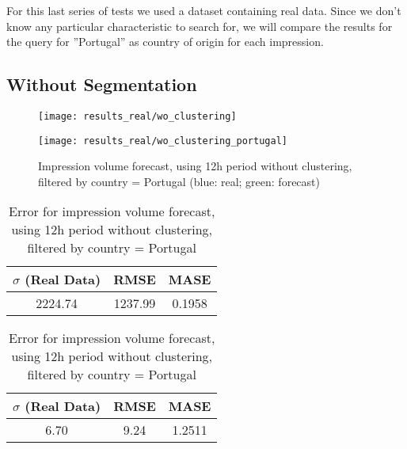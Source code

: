 For this last series of tests we used a dataset containing real data. Since we
don't know any particular characteristic to search for, we will compare the
results for the query for ''Portugal'' as country of origin for each impression.

\subsection*{Without Segmentation}

\begin{figure}[!ht]
\centering
\begin{minipage}[t]{0.45\linewidth}
\texttt{[image: results\_real/wo\_clustering]}
\caption[Volume
impression forecast, real data]{Impression volume
forecast, using 12h period without clustering (blue: real; green: forecast)}
\label{fig:vol_real_data_wo_clustering}
\end{minipage}
\quad
\begin{minipage}[t]{0.45\linewidth}
\texttt{[image: results\_real/wo\_clustering\_portugal]} \caption[Volume
impression forecast, real data, Portugal]{Impression volume
forecast, using 12h period without clustering, filtered by country = Portugal (blue: real; green: forecast)}
\label{fig:vol_real_data_wo_clustering_filtered}
\end{minipage}

\end{figure}

\begin{table}[!ht]
\centering
\footnotesize
\begin{minipage}[t]{0.45\linewidth}
\centering
\footnotesize
\begin{tabular}{ccc}
 $\sigma$ (Real Data) & RMSE & MASE   \\ \hline
2224.74 & 1237.99 & 0.1958 \\
\end{tabular}

\vspace{0.5cm}

\caption[Volume
impression forecast, real data, without clustering]{Error for impression volume
forecast, using 12h period without clustering}
\label{tab:err_real_data_wo_clustering}
\end{minipage}
\quad
\begin{minipage}[t]{0.45\linewidth}
\centering
\footnotesize
\begin{tabular}{ccc}
 $\sigma$ (Real Data) & RMSE & MASE   \\ \hline
6.70 & 9.24 & 1.2511 \\
\end{tabular}

\vspace{0.5cm}

\caption[Volume
impression forecast, safari]{Error for impression volume
forecast, using 12h period without clustering, filtered by country = Portugal}
\label{tab:err_real_data_wo_clustering_filtered}
\end{minipage}

\end{table}

